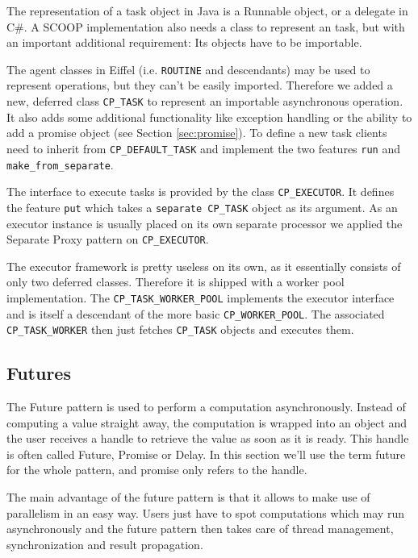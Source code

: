 The representation of a task object in Java is a Runnable object, or a delegate in C\#.
A SCOOP implementation also needs a class to represent an task, but with an important additional requirement: 
Its objects have to be importable.

The agent classes in Eiffel (i.e. \lstinline!ROUTINE! and descendants) may be used to represent operations, but they can't be easily imported.
Therefore we added a new, deferred class \lstinline!CP_TASK! to represent an importable asynchronous operation.
It also adds some additional functionality like exception handling or the ability to add a promise object (see Section \ref{sec:promise}).
To define a new task clients need to inherit from \lstinline!CP_DEFAULT_TASK! and implement the two features \lstinline!run! and \lstinline!make_from_separate!.

The interface to execute tasks is provided by the class \lstinline!CP_EXECUTOR!.
It defines the feature \lstinline!put! which takes a \lstinline!separate CP_TASK! object as its argument.
As an executor instance is usually placed on its own separate processor we applied the Separate Proxy pattern  on \lstinline!CP_EXECUTOR!.


The executor framework is pretty useless on its own, as it essentially consists of only two deferred classes.
Therefore it is shipped with a worker pool implementation.
The \lstinline!CP_TASK_WORKER_POOL! implements the executor interface and is itself a descendant of the more basic \lstinline!CP_WORKER_POOL!.
The associated \lstinline!CP_TASK_WORKER! then just fetches \lstinline!CP_TASK! objects and executes them.


\subsection{Futures}
\label{sec:futures}

The Future pattern  is used to perform a computation asynchronously.
Instead of computing a value straight away, the computation is wrapped into an object and the user receives a handle to retrieve the value as soon as it is ready.
This handle is often called Future, Promise or Delay.
In this section we'll use the term future for the whole pattern, and promise only refers to the handle.

The main advantage of the future pattern is that it allows to make use of parallelism in an easy way.
Users just have to spot computations which may run asynchronously and the future pattern then takes care of thread management, synchronization and result propagation.

